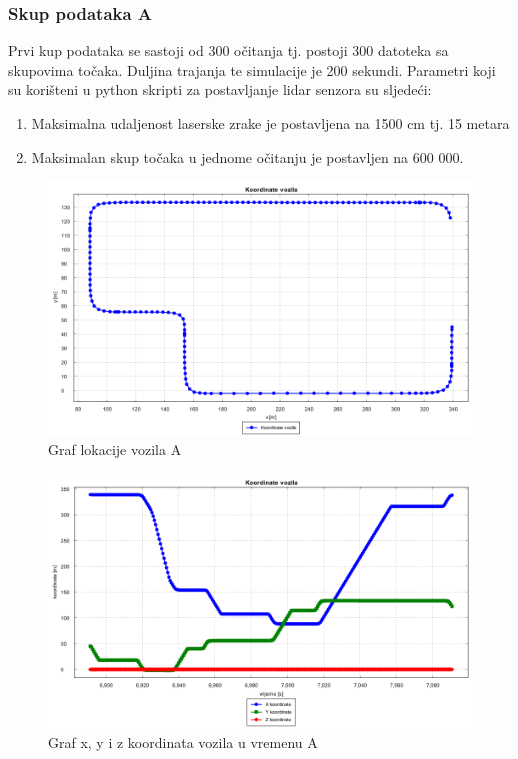 \subsubsection{Skup podataka A}
Prvi kup podataka se sastoji od 300 očitanja tj. postoji 300 datoteka sa skupovima točaka. Duljina trajanja te simulacije je 200 sekundi. Parametri koji su korišteni u python skripti za postavljanje lidar senzora su sljedeći:
\begin{enumerate}
  \item Maksimalna udaljenost laserske zrake je postavljena na 1500 cm tj. 15 metara
  \item Maksimalan skup točaka u jednome očitanju je postavljen na 600 000.
\end{enumerate}
\begin{figure}[H]
  \includegraphics[scale=0.4]{images/koordinate1.png}
  \caption{Graf lokacije vozila A}
  \label{fig:gt1_lokacija}
\end{figure}
\begin{figure}[H]
  \includegraphics[scale=0.4]{images/koordinate_vrijeme1.png}
  \caption{Graf x, y i z koordinata vozila u vremenu A}
  \label{fig:gt1_lokacija_koord}
\end{figure}
